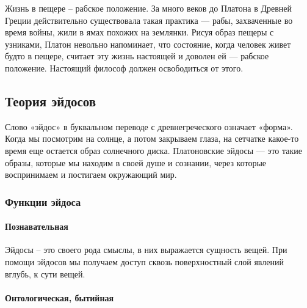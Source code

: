 \documentclass[
]{article}
\begin{document}
Жизнь в пещере -- рабское положение. За много веков до Платона в Древней
Греции действительно существовала такая практика --- рабы, захваченные
во время войны, жили в ямах похожих на землянки. Рисуя образ пещеры с
узниками, Платон невольно напоминает, что состояние, когда человек живет
будто в пещере, считает эту жизнь настоящей и доволен ей --- рабское
положение. Настоящий философ должен освободиться от этого.

\hypertarget{ux442ux435ux43eux440ux438ux44f-ux44dux439ux434ux43eux441ux43eux432}{%
\subsection{Теория
эйдосов}\label{ux442ux435ux43eux440ux438ux44f-ux44dux439ux434ux43eux441ux43eux432}}

Слово «эйдос» в буквальном переводе с древнегреческого означает «форма».
Когда мы посмотрим на солнце, а потом закрываем глаза, на сетчатке
какое-то время еще остается образ солнечного диска. Платоновские эйдосы
--- это такие образы, которые мы находим в своей душе и сознании, через
которые воспринимаем и постигаем окружающий мир.

\hypertarget{ux444ux443ux43dux43aux446ux438ux438-ux44dux439ux434ux43eux441ux430}{%
\subsubsection{Функции
эйдоса}\label{ux444ux443ux43dux43aux446ux438ux438-ux44dux439ux434ux43eux441ux430}}

\hypertarget{ux43fux43eux437ux43dux430ux432ux430ux442ux435ux43bux44cux43dux430ux44f}{%
\paragraph{Познавательная}\label{ux43fux43eux437ux43dux430ux432ux430ux442ux435ux43bux44cux43dux430ux44f}}

Эйдосы -- это своего рода смыслы, в них выражается сущность вещей. При
помощи эйдосов мы получаем доступ сквозь поверхностный слой явлений
вглубь, к сути вещей.

\hypertarget{ux43eux43dux442ux43eux43bux43eux433ux438ux447ux435ux441ux43aux430ux44f-ux431ux44bux442ux438ux439ux43dux430ux44f}{%
\paragraph{Онтологическая,
бытийная}\label{ux43eux43dux442ux43eux43bux43eux433ux438ux447ux435ux441ux43aux430ux44f-ux431ux44bux442ux438ux439ux43dux430ux44f}}
\end{document}
